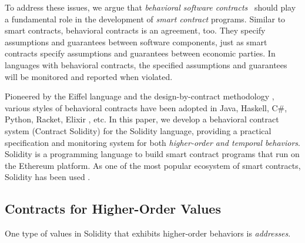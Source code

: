 To address these issues, we argue that \emph{behavioral software
contracts}~\cite{DBLP:conf/tools/Meyer98a} should play a fundamental role in
the development of \emph{smart contract} programs.
Similar to smart contracts, behavioral contracts is an agreement, too. They
specify assumptions and guarantees between software components, just as
smart contracts specify assumptions and guarantees between economic parties.
In languages with behavioral contracts, the specified assumptions and
guarantees will be monitored and reported when violated.

Pioneered by the Eiffel language \cite{DBLP:books/ph/Meyer91} and the
design-by-contract methodology \cite{DBLP:conf/tools/Meyer98a}, various styles
of behavioral contracts have been adopted in Java, Haskell, C\#, Python,
Racket, Elixir \cite{DBLP:conf/erlang/0001BBHMEF22}, etc. 
In this paper, we develop a behavioral contract system \lang (Contract
Solidity) for the Solidity language, providing a practical specification and
monitoring system for both \emph{higher-order and temporal behaviors}.
Solidity is a programming language to build smart contract programs that run on
the Ethereum platform.  As one of the most popular ecosystem of smart
contracts, Solidity has been used .



\subsection*{\textbf{Contracts for Higher-Order Values}}

One type of values in Solidity that exhibits higher-order behaviors is \emph{addresses}.

